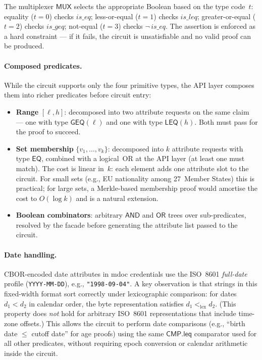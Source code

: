 The multiplexer $\mathsf{MUX}$ selects the appropriate Boolean based on the type code~$t$: equality ($t=0$) checks $\mathit{is\_eq}$; less-or-equal ($t=1$) checks $\mathit{is\_leq}$; greater-or-equal ($t=2$) checks $\mathit{is\_geq}$; not-equal ($t=3$) checks $\neg\,\mathit{is\_eq}$.  The assertion is enforced as a hard constraint --- if it fails, the circuit is unsatisfiable and no valid proof can be produced.

\paragraph{Composed predicates.}
While the circuit supports only the four primitive types, the API layer composes them into richer predicates before circuit entry:
\begin{itemize}
  \item \textbf{Range} $[\ell, h]$: decomposed into two attribute requests on the same claim --- one with type $\mathsf{GEQ}(\ell)$ and one with type $\mathsf{LEQ}(h)$.  Both must pass for the proof to succeed.
  \item \textbf{Set membership} $\{v_1, \ldots, v_k\}$: decomposed into $k$ attribute requests with type $\mathsf{EQ}$, combined with a logical~OR at the API layer (at least one must match).  The cost is linear in~$k$: each element adds one attribute slot to the circuit.  For small sets (e.g., EU nationality among 27~Member States) this is practical; for large sets, a Merkle-based membership proof would amortise the cost to $O(\log k)$ and is a natural extension.
  \item \textbf{Boolean combinators}: arbitrary $\mathsf{AND}$ and $\mathsf{OR}$ trees over sub-predicates, resolved by the facade before generating the attribute list passed to the circuit.
\end{itemize}

\paragraph{Date handling.}
CBOR-encoded date attributes in mdoc credentials use the ISO~8601 \emph{full-date} profile (\texttt{YYYY-MM-DD}), e.g., \texttt{"1998-09-04"}.  A key observation is that strings in this fixed-width format sort correctly under lexicographic comparison: for dates $d_1 < d_2$ in calendar order, the byte representation satisfies $d_1 <_{\mathrm{lex}} d_2$.  (This property does \emph{not} hold for arbitrary ISO~8601 representations that include time-zone offsets.)  This allows the circuit to perform date comparisons (e.g., ``birth date $\leq$ cutoff date'' for age proofs) using the same $\mathsf{CMP.leq}$ comparator used for all other predicates, without requiring epoch conversion or calendar arithmetic inside the circuit.

